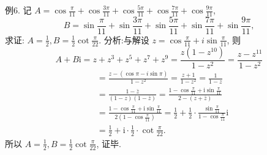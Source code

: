 例6. 记 $A=\cos \frac{\pi}{11}+\cos \frac{3 \pi}{11}+\cos \frac{5 \pi}{11}+\cos \frac{7 \pi}{11}+\cos \frac{9 \pi}{11}$,
$$
B=\sin \frac{\pi}{11}+\sin \frac{3 \pi}{11}+\sin \frac{5 \pi}{11}+\sin \frac{7 \pi}{11}+\sin \frac{9 \pi}{11},
$$
求证: $A=\frac{1}{2}, B=\frac{1}{2} \cot \frac{\pi}{22}$.
分析:与解设 $z=\cos \frac{\pi}{11}+i \sin \frac{\pi}{11}$, 则
$$
A+B \mathrm{i}=z+z^3+z^5+z^7+z^9=\frac{z\left(1-z^{10}\right)}{1-z^2}=\frac{z-z^{11}}{1-z^2}
$$
$$
\begin{aligned}
& =\frac{z-(\cos \pi-i \sin \pi)}{1-z^2}=\frac{z+1}{1-z^2}=\frac{1}{1-z} \\
& =\frac{1-\bar{z}}{(1-z)(1-\bar{z})}=\frac{1-\cos \frac{\pi}{11}+\mathrm{i} \sin \frac{\pi}{11}}{2-(z+\bar{z})} \\
& =\frac{1-\cos \frac{\pi}{11}+\mathrm{i} \sin \frac{\pi}{11}}{2\left(1-\cos \frac{\pi}{11}\right)}=\frac{1}{2}+\frac{1}{2} \cdot \frac{\sin \frac{\pi}{11}}{1-\cos \frac{\pi}{11}} \mathrm{i} \\
& =\frac{1}{2}+\mathrm{i} \cdot \frac{1}{2} \cdot \cot \frac{\pi}{22} .
\end{aligned}
$$
所以 $A=\frac{1}{2}, B=\frac{1}{2} \cot \frac{\pi}{22}$, 证毕.



